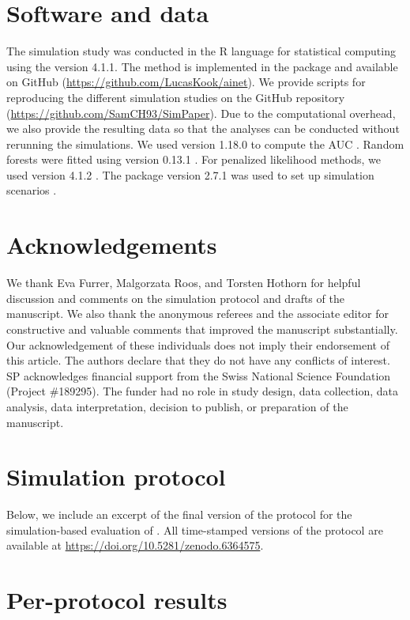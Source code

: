 \documentclass[a4paper, 11pt]{article}
\begin{document}
\section*{Software and data}
The simulation study was conducted in the \textsf{R} language for statistical
computing \citep{pkg:base} using the version 4.1.1. The method
\ainet{} is implemented in the  package and available on GitHub 
(\url{https://github.com/LucasKook/ainet}). We provide scripts for
reproducing the different simulation studies on the GitHub repository
(\url{https://github.com/SamCH93/SimPaper}).
Due to the computational overhead, we also provide the resulting data 
so that the analyses can be conducted without rerunning the simulations.
We used  version 1.18.0 to compute the AUC \citep{pkg:proc}.
Random forests were fitted using  version 0.13.1 \citep{ranger2017}.
For penalized likelihood methods, we used  version 4.1.2
\citep{Friedman2010,Simon2011}.
The  package version 2.7.1 was used to set up simulation scenarios
\citep{Chalmers2020}.

\section*{Acknowledgements}
We thank Eva Furrer, Malgorzata Roos, and Torsten Hothorn for 
helpful discussion and comments on the simulation protocol and drafts of the
manuscript. 
We also thank the anonymous referees and the associate editor for constructive
and valuable comments that improved the manuscript substantially.
Our acknowledgement of these individuals does not imply their endorsement of this article.
The authors declare that they do not have any conflicts of interest.
SP acknowledges financial support from the Swiss National Science Foundation
(Project \#189295). The funder had no role in study design, data collection,
data analysis, data interpretation, decision to publish, or preparation of 
the manuscript.

\begin{appendices}

\section{Simulation protocol}
\label{appendix:protocol}

Below, we include an excerpt of the final version of the protocol for the 
simulation-based evaluation of \ainet{}. All time-stamped versions
of the protocol are available at \url{https://doi.org/10.5281/zenodo.6364575}.



\section{Per-protocol results}
\label{appendix:per-protocol-results}



\end{appendices}



\end{document}
